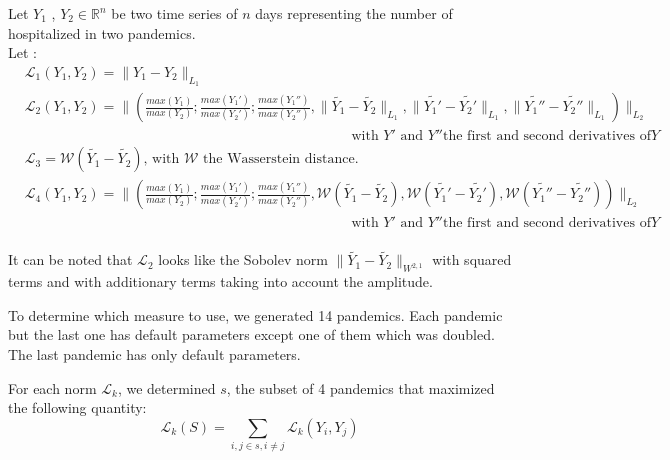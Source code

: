 Let $Y_1$ ,  $Y_2 \in \mathbb{R}^n$  be two time series of $n$ days representing the number of hospitalized in two pandemics.  \\[0.2cm]

Let :  \\

$
\begin{aligned}
    &\mathcal{L}_1(Y_1, Y_2) = \| Y_1 - Y_2 \|_{L_1}  \\
    &\mathcal{L}_2(Y_1, Y_2) = \| (\frac{max(Y_1)}{max(Y_2)} ;\frac{max(Y_1')}{max(Y_2')} ; \frac{max(Y_1'')}{max(Y_2'')} , \| \tilde{Y_1} - \tilde{Y_2} \|_{L_1}, \| \tilde{Y_1'} - \tilde{Y_2'} \|_{L_1} , \| \tilde{Y_1''} - \tilde{Y_2''} \|_{L_1} ) \|_{L_2} \\
    &\quad \quad\quad\quad\quad \quad\quad\quad \quad\quad\quad\quad \quad\quad\quad\quad \quad\quad\quad\quad \quad\quad\quad\text{ with }Y' \text{ and } Y'' \text{the first and second derivatives of} Y\\
    &\mathcal{L}_3 = \mathcal{W}(\tilde{Y_1} - \tilde{Y_2}) \text{, with }\mathcal{W} \text{ the Wasserstein distance.} \\
    &\mathcal{L}_4(Y_1, Y_2) = \| (\frac{max(Y_1)}{max(Y_2)} ;\frac{max(Y_1')}{max(Y_2')} ; \frac{max(Y_1'')}{max(Y_2'')} , \mathcal{W} (\tilde{Y_1} - \tilde{Y_2} ),\mathcal{W} ( \tilde{Y_1'} - \tilde{Y_2'} ) , \mathcal{W} (\tilde{Y_1''} - \tilde{Y_2''} ) ) \|_{L_2} \\
    &\quad \quad\quad\quad\quad \quad\quad\quad \quad\quad\quad\quad \quad\quad\quad\quad \quad\quad\quad\quad \quad\quad\quad\text{ with }Y' \text{ and } Y'' \text{the first and second derivatives of} Y\\[1cm]
\end{aligned}
$

It can be noted that $\mathcal{L}_2$ looks like the Sobolev norm  $\| \tilde{Y_1}  - \tilde{Y_2} \|_{W^{2, 1}} $ with squared terms and with additionary terms taking into account the amplitude. 

To determine which measure to use, we generated 14 pandemics. 
Each pandemic but the last one has default parameters except one of them which was doubled. 
The last pandemic has only default parameters. 

For each norm $\mathcal{L}_k$, we determined $s$,  the subset of 4 pandemics that maximized the following quantity:\\

\[ \mathcal{L}_k(S) = \sum_{i, j \in s, i \neq j} \mathcal{L}_k(Y_i, Y_j) \]

